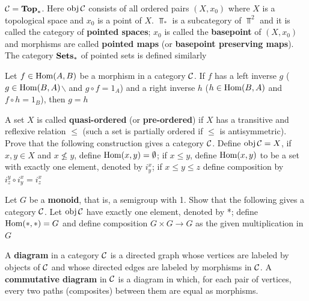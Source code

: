 \documentclass[11pt]{article}
\begin{document}
\begin{examplle}[]
\(\mathcal{C}=\operatorname{\textbf{Top}}_*\). Here \(\operatorname{obj}\mathcal{C}\) consists of all ordered pairs \((X,x_0)\) where \(X\) is a
topological space and \(x_0\) is a point of \(X\). \(\Top_*\) is a subcategory of \(\Top^2\) and
it is called the category of \textbf{pointed spaces}; \(x_0\) is called the \textbf{basepoint} of \((X,x_0)\) and
morphisms are called \textbf{pointed maps} (or \textbf{basepoint preserving maps}). The category \(\operatorname{\textbf{Sets}}_*\) of
pointed sets is defined similarly
\end{examplle}

\begin{exercise}
\label{ex0.7}
Let \(f\in\operatorname{Hom}(A,B)\) be a morphism in a category \(\mathcal{C}\). If \(f\) has a left inverse \(g\)
(\(g\in\operatorname{Hom}(B,A)\)$\backslash$ and \(g\circ f=1_A\)) and a right inverse \(h\) (\(h\in\operatorname{Hom}(B,A)\) and \(f\circ h=1_B\)),
then \(g=h\)
\end{exercise}

\begin{exercise}
\label{ex0.9}
A set \(X\) is called \textbf{quasi-ordered} (or \textbf{pre-ordered}) if \(X\) has a transitive and reflexive
relation \(\le\) (such a set is partially ordered if \(\le\) is antisymmetric). Prove that the
following construction gives a category \(\mathcal{C}\). Define \(\operatorname{obj}\mathcal{C}=X\), if \(x,y\in X\)
and \(x\not\le y\), define \(\operatorname{Hom}(x,y)=\emptyset\); if \(x\le y\), define \(\operatorname{Hom}(x,y)\) to be a set with
exactly one element, denoted by \(i_y^x\); if \(x\le y\le z\) define composition by \(i_z^y\circ i_y^x=i_z^x\)
\end{exercise}

\begin{exercise}
\label{ex0.10}
Let \(G\) be a \textbf{monoid}, that is, a semigroup with 1. Show that the following gives a
category \(\mathcal{C}\). Let \(\operatorname{obj}\mathcal{C}\) have exactly one element, denoted by *​; define \(\operatorname{Hom}(*,*)=G\) and
define composition \(G\times G\to G\) as the given multiplication in \(G\)
\end{exercise}

\begin{definition}[]
A \textbf{diagram} in a category \(\mathcal{C}\) is a directed graph whose vertices are labeled by objects of \(\mathcal{C}\) and
whose directed edges are labeled by morphisms in \(\mathcal{C}\). A \textbf{commutative diagram} in \(\mathcal{C}\) is a diagram in
which, for each pair of vertices, every two paths (composites) between them are equal as
morphisms.
\end{definition}
\end{document}
